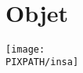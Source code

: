 
\maketitle

\thispagestyle{empty}

\hfill\\
\vfill

\section*{Objet}
\Object

\begin{center}
    \texttt{[image: \\PIXPATH/insa]}\hfill\\
\end{center}

\pagebreak
